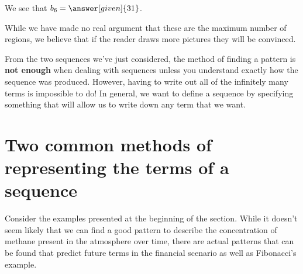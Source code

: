 \documentclass{ximera}
\begin{document}
\begin{example}
\begin{explanation}
\begin{itemize}
 We see that $b_6 = \answer[given]{31}$.
    \end{itemize}
    While we have made no real argument that these are the maximum
    number of regions, we believe that if the reader draws
    more pictures they will be convinced.
  \end{explanation}
\end{example}


From the two sequences we've just considered, the method of finding
a pattern is \textbf{not enough} when dealing with sequences unless
you understand exactly how the sequence was produced.  However, having
to write out all of the infinitely many terms is impossible to do!  In general, we
want to define a sequence by specifying something that will allow us to
write down any term that we want.  














\section{Two common methods of representing the terms of a sequence}

Consider the examples presented at the beginning of the section.  While it doesn't seem likely that we can find a good pattern to describe the concentration of methane present in the atmosphere over time, there are actual patterns that can be found that predict future terms in the financial scenario as well as Fibonacci's example.
\end{document}
